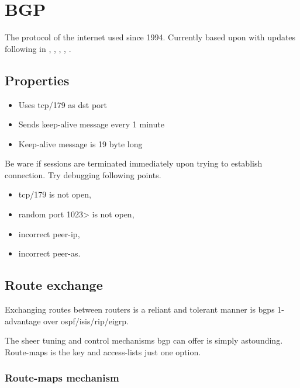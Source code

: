 \section{BGP}


The protocol of the internet used since 1994.\cite{wiki:Border_Gateway_Protocol}
Currently based upon  with updates following in  , , , , .

\subsection{Properties}

\begin{itemize}
    \item Uses tcp/179 as \gls{dst} port
    \item Sends keep-alive message every 1 minute
    \item Keep-alive message is 19 byte long
\end{itemize}

Be ware if sessions are terminated immediately upon trying to establish connection. Try debugging following points.

\begin{itemize}
    \item tcp/179 is not open,
    \item random port 1023> is not open,
    \item incorrect peer-ip,
    \item incorrect peer-as.
\end{itemize}

\subsection{Route exchange}

Exchanging routes between routers is a reliant and tolerant manner is \glspl{bgp} 1-advantage over \gls{ospf}/\gls{isis}/\gls{rip}/\gls{eigrp}.

The sheer tuning and control mechanisms \gls{bgp} can offer is simply astounding. Route-maps is the key and access-lists just one option.

\subsubsection[Route-maps]{Route-maps mechanism}

